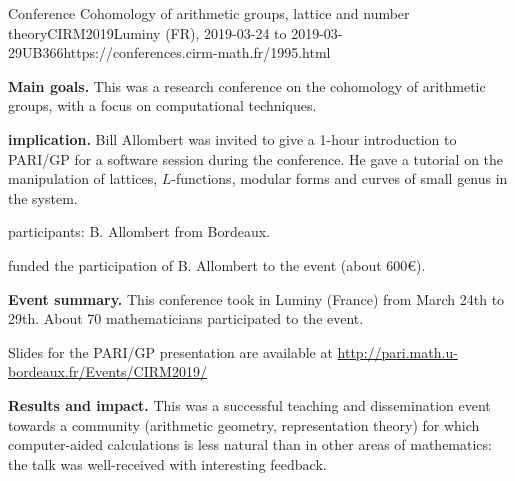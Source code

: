 \begin{event}{Conference Cohomology of arithmetic groups, lattice and number
  theory}{CIRM2019}{Luminy (FR),
  2019-03-24 to
  2019-03-29}{UB}{36}{6}{https://conferences.cirm-math.fr/1995.html}
  
\textbf{Main goals.} This was a research conference on the cohomology of
arithmetic groups, with a focus on computational techniques.

\textbf{\ODK implication.} Bill Allombert was invited to give a 1-hour
introduction to PARI/GP for a software session during the conference.
He gave a tutorial on the manipulation of lattices, $L$-functions,
modular forms and curves of small genus in the system.

\ODK participants: B. Allombert from Bordeaux.

\ODK funded the participation of B. Allombert to the event (about 600\euro).

\textbf{Event summary.} This conference took in Luminy (France) from March 24th
to 29th. About 70 mathematicians participated to the event.

Slides for the PARI/GP presentation are available at
\url{http://pari.math.u-bordeaux.fr/Events/CIRM2019/}

\textbf{Results and impact.} This was a successful teaching and dissemination
event towards a community (arithmetic geometry, representation theory)
for which computer-aided calculations is less natural than in other
areas of mathematics: the talk was well-received with interesting
feedback.
\end{event}

